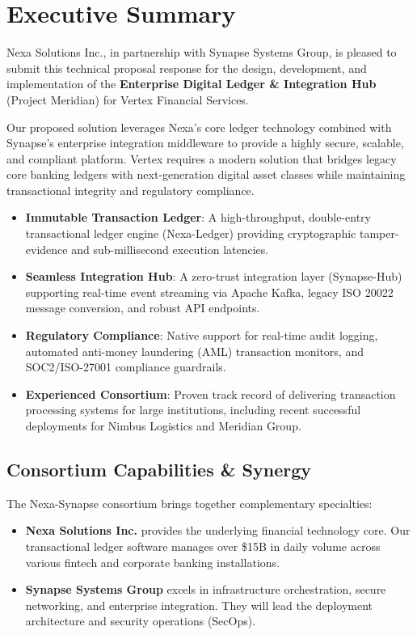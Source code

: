 \section{Executive Summary}
\label{sec:exec_summary}

Nexa Solutions Inc., in partnership with Synapse Systems Group, is pleased to submit this technical proposal response for the design, development, and implementation of the \textbf{Enterprise Digital Ledger \& Integration Hub} (Project Meridian) for Vertex Financial Services. 

Our proposed solution leverages Nexa's core ledger technology combined with Synapse's enterprise integration middleware to provide a highly secure, scalable, and compliant platform. Vertex requires a modern solution that bridges legacy core banking ledgers with next-generation digital asset classes while maintaining transactional integrity and regulatory compliance.

\begin{tcolorbox}[accentbox, title=Key Proposal Highlights]
\begin{itemize}
  \item \textbf{Immutable Transaction Ledger}: A high-throughput, double-entry transactional ledger engine (Nexa-Ledger) providing cryptographic tamper-evidence and sub-millisecond execution latencies.
  \item \textbf{Seamless Integration Hub}: A zero-trust integration layer (Synapse-Hub) supporting real-time event streaming via Apache Kafka, legacy ISO 20022 message conversion, and robust API endpoints.
  \item \textbf{Regulatory Compliance}: Native support for real-time audit logging, automated anti-money laundering (AML) transaction monitors, and SOC2/ISO-27001 compliance guardrails.
  \item \textbf{Experienced Consortium}: Proven track record of delivering transaction processing systems for large institutions, including recent successful deployments for Nimbus Logistics and Meridian Group.
\end{itemize}
\end{tcolorbox}

\subsection{Consortium Capabilities \& Synergy}
The Nexa-Synapse consortium brings together complementary specialties:
\begin{itemize}
  \item \textbf{Nexa Solutions Inc.} provides the underlying financial technology core. Our transactional ledger software manages over \$15B in daily volume across various fintech and corporate banking installations.
  \item \textbf{Synapse Systems Group} excels in infrastructure orchestration, secure networking, and enterprise integration. They will lead the deployment architecture and security operations (SecOps).
\end{itemize}
